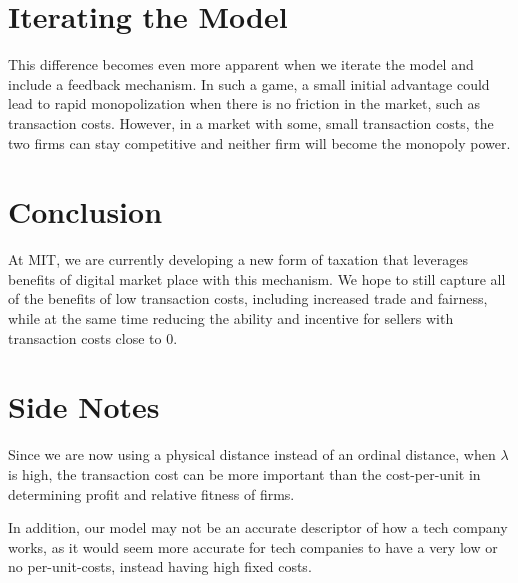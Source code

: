 \documentclass[final,5p,times,twocolumn,11pt]{elsarticle}
\numberwithin{equation}{section} %
\begin{document}
\section{Iterating the Model}
This difference becomes even more apparent when we iterate the model and
include a feedback mechanism. In such a game, a small initial advantage could
lead to rapid monopolization when there is no friction in the market, such as
transaction costs. However, in a market with some, small transaction costs, the
two firms can stay competitive and neither firm will become the monopoly power.

\section{Conclusion}

At MIT, we are currently developing a new form of taxation that leverages
benefits of digital market place with this mechanism. We hope to still capture
all of the benefits of low transaction costs, including increased trade and
fairness, while at the same time reducing the ability and incentive for sellers
with transaction costs close to 0.

\section{Side Notes}
Since we are now using a physical distance instead of an ordinal distance, when $\lambda$ is high, the transaction cost can be more important than the cost-per-unit in determining profit and relative fitness of firms.

In addition, our model may not be an accurate descriptor of how a tech company works, as it would seem more accurate for tech companies to have a very low or no per-unit-costs, instead having high fixed costs.
\end{document}

